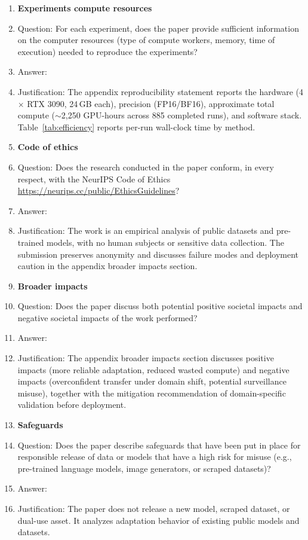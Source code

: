 \begin{enumerate}
\item {\bf Experiments compute resources}
    \item[] Question: For each experiment, does the paper provide sufficient information on the computer resources (type of compute workers, memory, time of execution) needed to reproduce the experiments?
    \item[] Answer: \answerYes{}
    \item[] Justification: The appendix reproducibility statement reports the hardware (4$\times$ RTX 3090, 24\,GB each), precision (FP16/BF16), approximate total compute (${\sim}$2,250 GPU-hours across 885 completed runs), and software stack. Table~\ref{tab:efficiency} reports per-run wall-clock time by method.

\item {\bf Code of ethics}
    \item[] Question: Does the research conducted in the paper conform, in every respect, with the NeurIPS Code of Ethics \url{https://neurips.cc/public/EthicsGuidelines}?
    \item[] Answer: \answerYes{}
    \item[] Justification: The work is an empirical analysis of public datasets and pre-trained models, with no human subjects or sensitive data collection. The submission preserves anonymity and discusses failure modes and deployment caution in the appendix broader impacts section.

\item {\bf Broader impacts}
    \item[] Question: Does the paper discuss both potential positive societal impacts and negative societal impacts of the work performed?
    \item[] Answer: \answerYes{}
    \item[] Justification: The appendix broader impacts section discusses positive impacts (more reliable adaptation, reduced wasted compute) and negative impacts (overconfident transfer under domain shift, potential surveillance misuse), together with the mitigation recommendation of domain-specific validation before deployment.

\item {\bf Safeguards}
    \item[] Question: Does the paper describe safeguards that have been put in place for responsible release of data or models that have a high risk for misuse (e.g., pre-trained language models, image generators, or scraped datasets)?
    \item[] Answer: \answerNA{}
    \item[] Justification: The paper does not release a new model, scraped dataset, or dual-use asset. It analyzes adaptation behavior of existing public models and datasets.


\end{enumerate}
